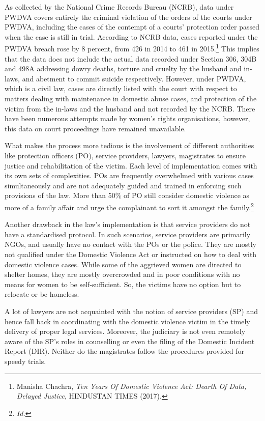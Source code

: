 \begin{multicols}{2}

\noi
As collected by the National Crime Records Bureau (NCRB), data under PWDVA covers
entirely the criminal violation of the orders of the courts under PWDVA, including the cases
of the contempt of a courts’ protection order passed when the case is still in trial. According
to NCRB data, cases reported under the PWDVA breach rose by 8 percent, from 426 in 2014
to 461 in 2015.\footnote{Manisha Chachra, \textit{Ten Years Of Domestic Violence Act: Dearth Of Data, Delayed Justice}, HINDUSTAN
TIMES (2017).} This implies that the data does not include the actual data recorded under
Section 306, 304B and 498A addressing dowry deaths, torture and cruelty by the husband and
in-laws, and abetment to commit suicide respectively. However, under PWDVA, which is a
civil law, cases are directly listed with the court with respect to matters dealing with
maintenance in domestic abuse cases, and protection of the victim from the in-laws and the
husband and not recorded by the NCRB. There have been numerous attempts made by
women's rights organisations, however, this data on court proceedings have remained
unavailable. 

\noi
What makes the process more tedious is the involvement of different authorities like
protection officers (PO), service providers, lawyers, magistrates to ensure justice and
rehabilitation of the victim. Each level of implementation comes with its own sets of
complexities. POs are frequently overwhelmed with various cases simultaneously and are not
adequately guided and trained in enforcing such provisions of the law. More than 50\% of PO
still consider domestic violence as more of a family affair and urge the complainant to sort it
amongst the family.\footnote{\textit{Id.}}

\noi
Another drawback in the law's implementation is that service providers do not have a
standardised protocol. In such scenarios, service providers are primarily NGOs, and usually
have no contact with the POs or the police. They are mostly not qualified under the Domestic
Violence Act or instructed on how to deal with domestic violence cases. While some of the
aggrieved women are directed to shelter homes, they are mostly overcrowded and in poor
conditions with no means for women to be self-sufficient. So, the victims have no option but
to relocate or be homeless. 

\noi
A lot of lawyers are not acquainted with the notion of service providers (SP) and hence fall
back in coordinating with the domestic violence victim in the timely delivery of proper legal
services. Moreover, the judiciary is not even remotely aware of the SP’s roles in counselling
or even the filing of the Domestic Incident Report (DIR). Neither do the magistrates follow
the procedures provided for speedy trials. 


\end{multicols}
